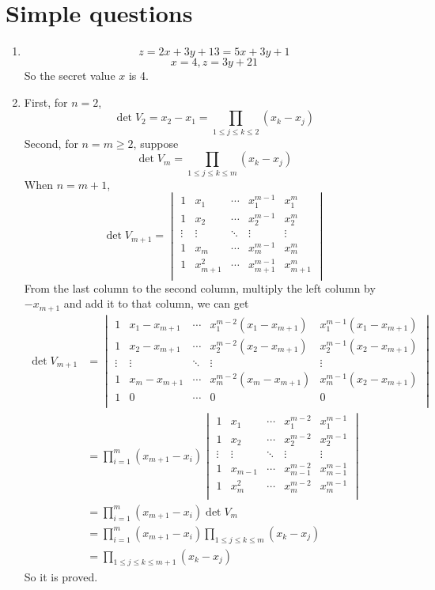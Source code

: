 \documentclass{article}
\begin{document}
\section{Simple questions}
\begin{enumerate}
\item
$$z=2x+3y+13=5x+3y+1$$
$$x=4,z=3y+21$$
So the secret value $x$ is 4.
\item
First, for $n=2$, $$\det V_2=x_2-x_1=\prod_{1\leqslant j\leqslant k\leqslant 2}(x_k-x_j)$$
Second, for $n=m\geqslant 2$, suppose $$\det V_m=\prod_{1\leqslant j\leqslant k\leqslant m}(x_k-x_j)$$
When $n=m+1$, 
$$\det V_{m+1}=
\begin{vmatrix}
1 & x_1 & \cdots & x_1^{m-1} & x_1^m \\
1 & x_2 & \cdots & x_2^{m-1} & x_2^m \\
\vdots & \vdots & \ddots & \vdots & \vdots \\
1 & x_m & \cdots & x_m^{m-1} & x_m^m \\
1 & x_{m+1}^2 & \cdots & x_{m+1}^{m-1} & x_{m+1}^m \\
\end{vmatrix}
$$
From the last column to the second column, multiply the left column by $-x_{m+1}$ and add it to that column, we can get
$$
\begin{aligned}
\det V_{m+1}&=
\begin{vmatrix}
1 & x_1-x_{m+1} & \cdots & x_1^{m-2}(x_1-x_{m+1}) & x_1^{m-1}(x_1-x_{m+1}) \\
1 & x_2-x_{m+1} & \cdots & x_2^{m-2}(x_2-x_{m+1}) & x_2^{m-1}(x_2-x_{m+1}) \\
\vdots & \vdots & \ddots & \vdots & \vdots \\
1 & x_m-x_{m+1} & \cdots & x_m^{m-2}(x_m-x_{m+1}) & x_m^{m-1}(x_2-x_{m+1}) \\
1 & 0 & \cdots & 0 & 0 \\
\end{vmatrix}\\
&=\prod_{i=1}^m(x_{m+1}-x_i)
\begin{vmatrix}
1 & x_1 & \cdots & x_1^{m-2} & x_1^{m-1} \\
1 & x_2 & \cdots & x_2^{m-2} & x_2^{m-1} \\
\vdots & \vdots & \ddots & \vdots & \vdots \\
1 & x_{m-1} & \cdots & x_{m-1}^{m-2} & x_{m-1}^{m-1} \\
1 & x_m^2 & \cdots & x_m^{m-2} & x_m^{m-1} \\
\end{vmatrix}\\
&=\prod_{i=1}^m(x_{m+1}-x_i)\det V_m\\
&=\prod_{i=1}^m(x_{m+1}-x_i)\prod_{1\leqslant j\leqslant k\leqslant m}(x_k-x_j)\\
&=\prod_{1\leqslant j\leqslant k\leqslant m+1}(x_k-x_j)
\end{aligned}
$$
So it is proved.
\end{enumerate}
\end{document}
